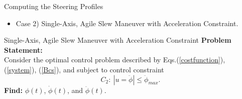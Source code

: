 \documentclass{beamer}
\begin{document}
\begin{frame}
\begin{block}{}
\begin{center}
{\LARGE{Computing the Steering Profiles}}
\begin{itemize}
\item Case 2)  Single-Axis, Agile Slew Maneuver with Acceleration Constraint.
\end{itemize}
\end{center}
\end{block}
\end{frame}

\begin{frame}
\begin{block}{ Single-Axis, Agile Slew Maneuver with Acceleration Constraint}
 {\bf Problem Statement:} \\ Consider the optimal control problem described by Eqs.(\ref{costfunction}), (\ref{system}), (\ref{Bcs}), and subject to control constraint
\begin{equation}
C_2: \ |u=\ddot{\phi}|\leq \ddot{\phi}_{max}.
\end{equation}
 {\bf Find:} $\phi(t)$, $\dot{\phi}(t)$, and $\ddot{\phi}(t)$.
 \end{block}
 \end{frame}
\end{document}
